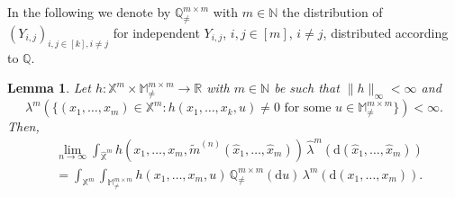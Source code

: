 \documentclass{article}
\newtheorem{lemma}[theorem]{Lemma}
\theoremstyle{definition}
\numberwithin{equation}{section}
\theoremstyle{remark}
\begin{document}
In the following we denote by $\mathbb{Q}^{m\times m}_{\neq}$ with $m\in\mathbb{N}$ the distribution of $(Y_{i,j})_{i,j\in[k], i\neq j}$ for independent $Y_{i,j}$, $i,j\in[m]$, $i\neq j$, distributed according to $\mathbb{Q}$.

\begin{lemma}\label{lma1}
Let $h: \mathbb{X}^m\times \mathbb{M}_{\neq}^{m\times m}\to \mathbb{R}$ with $m\in\mathbb{N}$ be such that $\|h\|_\infty<\infty$ and
$$
\lambda^m(\{ (x_1,\ldots,x_m)\in\mathbb{X}^m: h(x_1,\ldots,x_k,u)\neq 0 \text{ for some } u\in\mathbb{M}_{\neq}^{m\times m} \})<\infty.
$$
Then,
\begin{align*}
& \lim_{n\to\infty} \int_{\widehat{\mathbb{X}}^m} h(x_1,\ldots,x_m, \tilde{m}^{(n)}(\hat{x}_1,\ldots,\hat{x}_m)) \, \widehat{\lambda}^m(\mathrm{d}(\hat{x}_1,\ldots,\hat{x}_m) ) \\
& = \int_{\mathbb{X}^m} \int_{\mathbb{M}^{m\times m}_{\neq}} h(x_1,\ldots,x_m, u) \, \mathbb{Q}_{\neq}^{m\times m}(\mathrm{d}u) \, \lambda^m(\mathrm{d}(x_1,\ldots,x_m)).
\end{align*}
\end{lemma}
\end{document}
